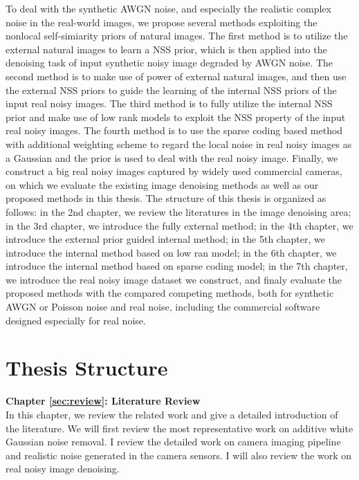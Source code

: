 To deal with the synthetic AWGN noise, and especially the realistic complex noise in the real-world images, we propose several methods exploiting the nonlocal self-simiarity priors of natural images. The first method is to utilize the external natural images to learn a NSS prior, which is then applied into the denoising task of input synthetic noisy image degraded by AWGN noise. The second method is to make use of power of external natural images, and then use the external NSS priors to guide the learning of the internal NSS priors of the input real noisy images. The third method is to fully utilize the internal NSS prior and make use of low rank models to exploit the NSS property of the input real noisy images. The fourth method is to use the sparse coding based method with additional weighting scheme to regard the local noise in real noisy images as a Gaussian and the prior is used to deal with the real noisy image. Finally, we construct a big real noisy images captured by widely used commercial cameras, on which we evaluate the existing image denoising methods as well as our proposed methods in this thesis. The structure of this thesis is organized as follows: in the 2nd chapter, we review the literatures in the image denoising area; in the 3rd chapter, we introduce the fully external method; in the 4th chapter, we introduce the external prior guided internal method; in the 5th chapter, we introduce the internal method based on low ran model; in the 6th chapter, we introduce the internal method based on sparse coding model; in the 7th chapter, we introduce the real noisy image dataset we construct, and finaly evaluate the proposed methods with the compared competing methods, both for synthetic AWGN or Poisson noise and real noise, including the commercial software designed especially for real noise. 


\section{Thesis Structure}
\label{sec:intro:structure}


\textbf{Chapter \ref{sec:review}: Literature Review} \\[0.2em]

In this chapter, we review the related work and give a detailed introduction of the literature. We will first review the most representative work on additive white Gaussian noise removal. I review the detailed work on camera imaging pipeline and realistic noise generated in the camera sensors. I will also review the work on real noisy image denoising.



